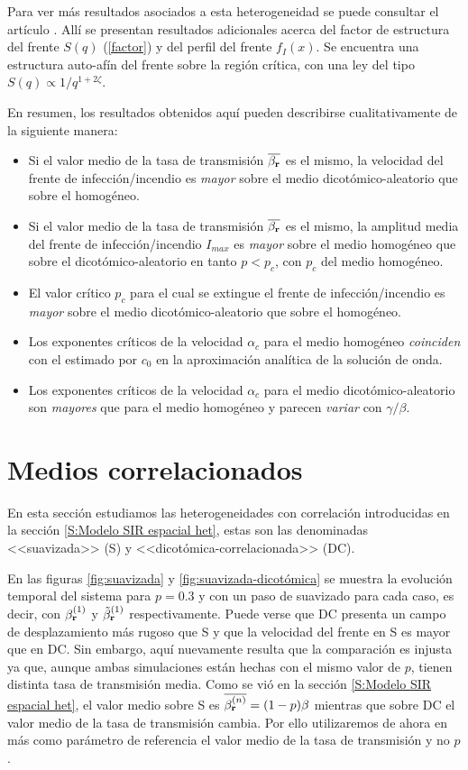  Para ver más resultados asociados a esta heterogeneidad se puede consultar el artículo \cite{kolton}. Allí se presentan resultados adicionales acerca del factor de 
 estructura del frente $S(q)$ (\ref{factor}) y del perfil del frente $f_I(x)$. Se encuentra una estructura auto-afín del frente sobre la región crítica, con una ley 
 del tipo $S(q)\propto 1/q^{1+2\zeta}$.

 En resumen, los resultados obtenidos aquí pueden describirse cualitativamente de la siguiente manera: 
 \begin{itemize}
     \item Si el valor medio de la tasa de transmisión $\overline{\beta_{\vb r}}$ es el mismo, la velocidad del frente de infección/incendio es \textit{mayor} sobre el medio 
     dicotómico-aleatorio que sobre el homogéneo.
     \item Si el valor medio de la tasa de transmisión $\overline{\beta_{\vb r}}$ es el mismo, la amplitud media del frente de infección/incendio $I_{max}$ es 
     \textit{mayor} sobre el medio homogéneo que sobre el dicotómico-aleatorio en tanto $p<p_c$, con $p_c$ del medio homogéneo.
     \item El valor crítico $p_c$ para el cual se extingue el frente de infección/incendio es \textit{mayor} sobre el medio dicotómico-aleatorio que sobre el homogéneo.
     \item Los exponentes críticos de la velocidad $\alpha_c$ para el medio homogéneo \textit{coinciden} con el estimado por $c_0$ en la aproximación analítica de la solución de onda.
     \item Los exponentes críticos de la velocidad $\alpha_c$ para el medio dicotómico-aleatorio son \textit{mayores} que para el medio homogéneo y parecen 
     \textit{variar} con $\gamma/\beta$.
 \end{itemize}

 
\section{Medios correlacionados}

En esta sección estudiamos las heterogeneidades con correlación introducidas en la sección \ref{S:Modelo SIR espacial het}, estas son las denominadas 
<<suavizada>> (S) y <<dicotómica-correlacionada>> (DC). 

En las figuras \ref{fig:suavizada} y \ref{fig:suavizada-dicotómica} se muestra la evolución temporal del sistema para 
$p=0.3$ y con un paso de suavizado para cada caso, es decir, con $\beta_{\vb r}^{(1)}$ y $\tilde{\beta}_{\vb r}^{(1)}$ respectivamente. Puede verse que DC presenta un 
campo de desplazamiento más rugoso que S y que la velocidad del frente en S es mayor que en DC. Sin embargo, aquí nuevamente resulta que la comparación es injusta 
ya que, aunque ambas simulaciones están hechas con el mismo valor de $p$, tienen distinta tasa de transmisión media. Como se vió en la sección 
\ref{S:Modelo SIR espacial het}, el valor medio sobre S es $\overline{\beta_{\vb r}^{(n)}}=(1-p)\beta$ mientras que sobre DC 
el valor medio de la tasa de transmisión cambia. Por ello utilizaremos de ahora en más como parámetro de referencia el valor medio de la tasa de transmisión y no $p$.


